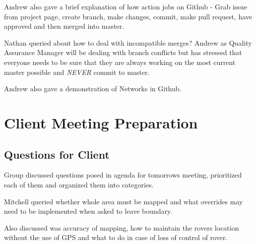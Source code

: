 \documentclass{article}
\begin{document}
Andrew also gave a brief explanation of how action jobs on Github - Grab issue from project page, create branch, make changes, commit, make pull request, have approved and then merged into master.\newline 

Nathan queried about how to deal with incompatible merges? Andrew as Quality Assurance Manager will be dealing with branch conflicts but has stressed that everyone needs to be sure that they are always working on the most current master possible and {\em NEVER} commit to master.\newline

Andrew also gave a demonstration of Networks in Github.	 

\section{Client Meeting Preparation}
\subsection{Questions for Client}
Group discussed questions posed in agenda for tomorrows meeting, prioritized each of them and organized them into categories.

Mitchell queried whether whole area must be mapped and what overrides may need to be implemented when asked to leave boundary.

Also discussed was accuracy of mapping, how to maintain the rovers location without the use of GPS and what to do in case of loss of control of rover.
\end{document}
